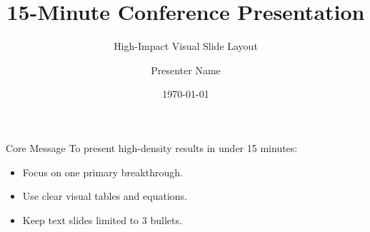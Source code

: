 \documentclass{beamer}
\title{15-Minute Conference Presentation}
\subtitle{High-Impact Visual Slide Layout}
\author{Presenter Name}
\date{\today}
\begin{document}
\maketitle

\begin{frame}{Core Message}
  To present high-density results in under 15 minutes:
  \begin{itemize}
    \item Focus on one primary breakthrough.
    \item Use clear visual tables and equations.
    \item Keep text slides limited to 3 bullets.
  \end{itemize}
\end{frame}
\end{document}
